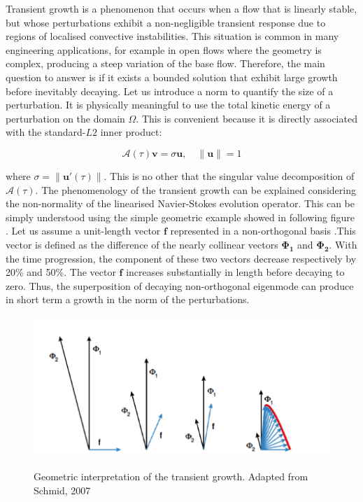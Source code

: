 Transient growth  is a phenomenon that occurs when a flow that is linearly stable, but whose perturbations exhibit a non-negligible transient response due to regions of localised convective instabilities. This situation is common in many engineering applications, for example in open flows where the geometry is complex, producing a steep variation of the base flow. Therefore, the main question to answer is if it exists a bounded solution that exhibit large growth before inevitably decaying. Let us introduce a norm to quantify the size of a perturbation. It is physically meaningful to use the total kinetic energy of a perturbation on the domain $\Omega$. This is convenient because it is directly associated with the
standard-$L2$ inner product:

\begin{equation}
\mathcal{A}(\tau)\mathbf{v}=\sigma \mathbf{u}, \quad \left\| \mathbf{u} \right\|=1
\end{equation}


where $\sigma=\left\| \mathbf{u'}(\tau)\right\|$. This is no other that the singular value decomposition of $\mathcal{A}(\tau)$. The phenomenology of the transient growth can be explained considering the non-normality of the linearised Navier-Stokes evolution operator. This can be simply understood using the simple geometric example showed in following figure . Let us assume a unit-length vector $\mathbf{f}$ represented in a non-orthogonal basis .This vector is defined as the difference of the nearly collinear vectors $\mathbf{\Phi_1}$ and $\mathbf{\Phi_2}$.  With the time progression, the component of these two vectors decrease respectively by 20\% and 50\%. The vector $\mathbf{f}$ increases substantially in length before decaying to zero. Thus, the superposition of decaying non-orthogonal eigenmode can produce in short term a growth in the norm of the perturbations.


\begin{figure}[!htbp]
\centering
 \label{TG}
 {\includegraphics[width=1 \textwidth]{Figures/transient_growth.png}}
   \caption {Geometric interpretation of the transient growth. Adapted from Schmid, 2007 }
\end{figure}


